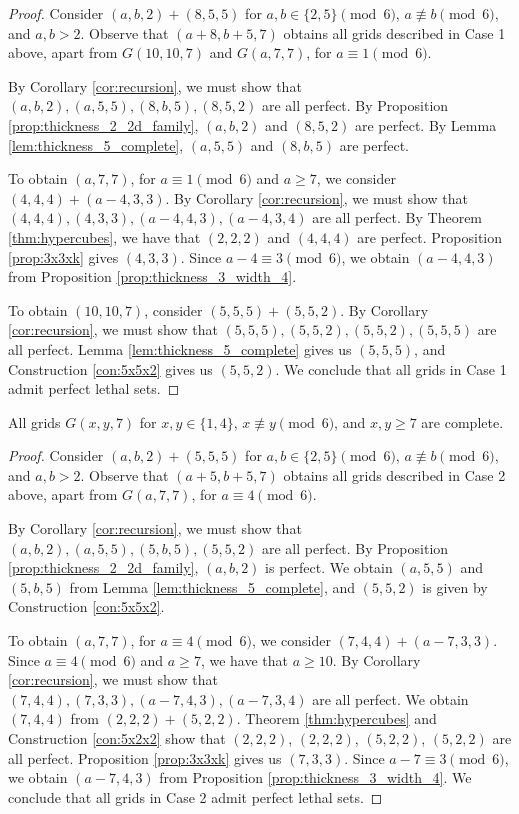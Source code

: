 \begin{proof}
Consider $(a,b,2) + (8,5,5)$ for $a,b \in \{2,5\} \pmod 6$, $a \not\equiv b \pmod 6$, and $a,b > 2$. Observe that $(a+8,b+5,7)$ obtains all grids described in Case 1 above, apart from $G(10,10,7)$ and $G(a, 7,7)$, for $a \equiv 1 \pmod 6$. 

By Corollary \ref{cor:recursion}, we must show that $(a,b,2), (a,5,5), (8,b,5), (8,5,2)$ are all perfect. By Proposition \ref{prop:thickness_2_2d_family}, $(a,b,2)$ and $(8,5,2)$ are perfect. By Lemma \ref{lem:thickness_5_complete}, $(a,5,5)$ and $(8,b,5)$ are perfect. 

To obtain $(a,7,7)$, for $a \equiv 1 \pmod 6$ and $a \ge 7$, we consider $(4,4,4) + (a-4,3,3)$. By Corollary \ref{cor:recursion}, we must show that $(4,4,4), (4,3,3), (a-4,4,3), (a-4,3,4)$ are all perfect. By Theorem \ref{thm:hypercubes}, we have that $(2,2,2)$ and $(4,4,4)$ are perfect. Proposition \ref{prop:3x3xk} gives $(4,3,3)$. Since $a-4 \equiv 3 \pmod 6$, we obtain $(a-4,4,3)$ from Proposition \ref{prop:thickness_3_width_4}.

To obtain $(10,10,7)$, consider $(5,5,5) + (5,5,2)$. By Corollary \ref{cor:recursion}, we must show that $(5,5,5), (5,5,2), (5,5,2), (5,5,5)$ are all perfect. Lemma \ref{lem:thickness_5_complete} gives us $(5,5,5)$, and Construction \ref{con:5x5x2} gives us $(5,5,2)$. We conclude that all grids in Case 1 admit perfect lethal sets. 
\end{proof}

\begin{lem}
\label{lem:thickness_7_case_2}
All grids $G(x,y,7)$ for $x,y \in \{1,4\}$, $x \not\equiv y \pmod 6$, and $x,y \geq 7$ are complete.
\end{lem}

\begin{proof}
Consider $(a,b,2) + (5,5,5)$ for $a,b \in \{2,5\} \pmod 6$, $a \not\equiv b \pmod 6$, and $a,b > 2$. Observe that $(a+5,b+5,7)$ obtains all grids described in Case 2 above, apart from $G(a,7,7)$, for $a \equiv 4 \pmod 6$. 

By Corollary \ref{cor:recursion}, we must show that $(a,b,2), (a,5,5), (5,b,5), (5,5,2)$ are all perfect. By Proposition \ref{prop:thickness_2_2d_family}, $(a,b,2)$ is perfect. We obtain $(a,5,5)$ and $(5,b,5)$ from Lemma \ref{lem:thickness_5_complete}, and $(5,5,2)$ is given by Construction \ref{con:5x5x2}.

To obtain $(a,7,7)$, for $a \equiv 4 \pmod 6$, we consider $(7,4,4) + (a-7,3,3)$. Since $a \equiv 4 \pmod 6$ and $a \geq 7$, we have that $a \geq 10$. By Corollary \ref{cor:recursion}, we must show that $(7,4,4), (7,3,3), (a-7,4,3), (a-7,3,4)$ are all perfect. We obtain $(7,4,4)$ from $(2,2,2) + (5,2,2)$. Theorem \ref{thm:hypercubes} and Construction \ref{con:5x2x2} show that $(2,2,2)$, $(2,2,2)$, $(5,2,2)$, $(5,2,2)$ are all perfect. Proposition \ref{prop:3x3xk} gives us $(7,3,3)$. Since $a-7 \equiv 3 \pmod 6$, we obtain $(a-7,4,3)$ from Proposition \ref{prop:thickness_3_width_4}. We conclude that all grids in Case 2 admit perfect lethal sets. 
\end{proof}


